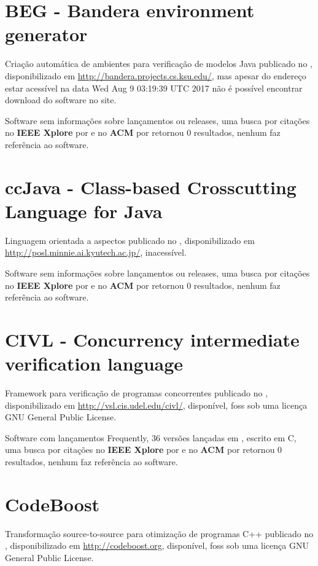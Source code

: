\section{BEG - Bandera environment generator}

Criação automática de ambientes para verificação de modelos Java
publicado no  ,
disponibilizado em \url{http://bandera.projects.cs.ksu.edu/},
mas apesar do endereço estar acessível na data 
Wed Aug  9 03:19:39 UTC 2017
não é possível encontrar download do software no site.

Software sem informações sobre lançamentos ou releases,
uma busca por citações no {\bf IEEE Xplore} por
\texttt{}
e no {\bf ACM} por
\texttt{}
retornou
0 resultados,
nenhum faz referência ao software.



\section{ccJava - Class-based Crosscutting Language for Java}

Linguagem orientada a aspectos
publicado no  ,
disponibilizado em \url{http://posl.minnie.ai.kyutech.ac.jp/},
inacessível.

Software sem informações sobre lançamentos ou releases,
uma busca por citações no {\bf IEEE Xplore} por
\texttt{}
e no {\bf ACM} por
\texttt{}
retornou
0 resultados,
nenhum faz referência ao software.



\section{CIVL - Concurrency intermediate verification language}

Framework para verificação de programas concorrentes
publicado no  ,
disponibilizado em \url{http://vsl.cis.udel.edu/civl/},
disponível,
foss
sob uma licença GNU General Public License.

Software com lançamentos Frequently,
36 versões lançadas
em ,
escrito em C,
uma busca por citações no {\bf IEEE Xplore} por
\texttt{}
e no {\bf ACM} por
\texttt{}
retornou
0 resultados,
nenhum faz referência ao software.



\section{CodeBoost}

Transformação source-to-source para otimização de programas C++
publicado no  ,
disponibilizado em \url{http://codeboost.org},
disponível,
foss
sob uma licença GNU General Public License.

